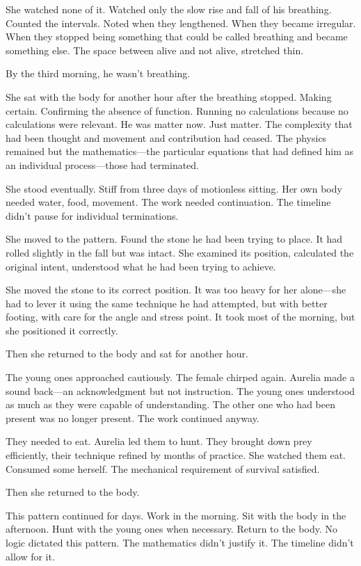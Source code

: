 She watched none of it. Watched only the slow rise and fall of his breathing. Counted the intervals. Noted when they lengthened. When they became irregular. When they stopped being something that could be called breathing and became something else. The space between alive and not alive, stretched thin.

By the third morning, he wasn't breathing.

She sat with the body for another hour after the breathing stopped. Making certain. Confirming the absence of function. Running no calculations because no calculations were relevant. He was matter now. Just matter. The complexity that had been thought and movement and contribution had ceased. The physics remained but the mathematics—the particular equations that had defined him as an individual process—those had terminated.

She stood eventually. Stiff from three days of motionless sitting. Her own body needed water, food, movement. The work needed continuation. The timeline didn't pause for individual terminations.

She moved to the pattern. Found the stone he had been trying to place. It had rolled slightly in the fall but was intact. She examined its position, calculated the original intent, understood what he had been trying to achieve.

She moved the stone to its correct position. It was too heavy for her alone—she had to lever it using the same technique he had attempted, but with better footing, with care for the angle and stress point. It took most of the morning, but she positioned it correctly.

Then she returned to the body and sat for another hour.

The young ones approached cautiously. The female chirped again. Aurelia made a sound back—an acknowledgment but not instruction. The young ones understood as much as they were capable of understanding. The other one who had been present was no longer present. The work continued anyway.

They needed to eat. Aurelia led them to hunt. They brought down prey efficiently, their technique refined by months of practice. She watched them eat. Consumed some herself. The mechanical requirement of survival satisfied.

Then she returned to the body.

This pattern continued for days. Work in the morning. Sit with the body in the afternoon. Hunt with the young ones when necessary. Return to the body. No logic dictated this pattern. The mathematics didn't justify it. The timeline didn't allow for it.

